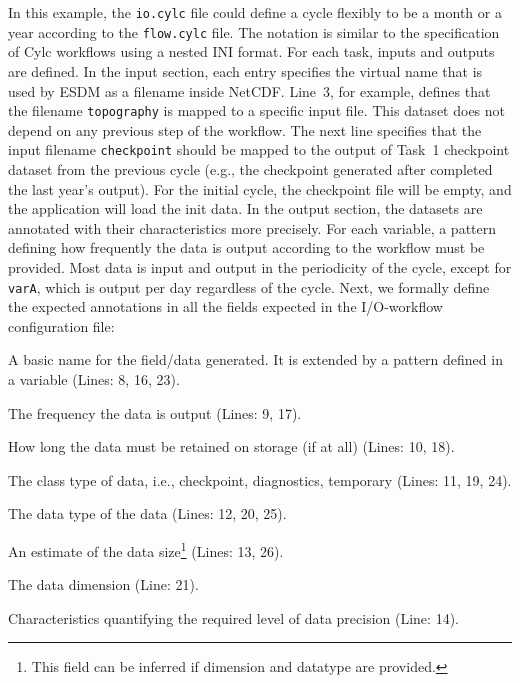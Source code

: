 \documentclass{superfri}
\begin{document}
In this example, the \texttt{io.cylc} file could define a cycle flexibly to be a month or a year according to the \texttt{flow.cylc} file.
The notation is similar to the specification of Cylc workflows using a nested INI format.
For each task, inputs and outputs are defined.
In the input section, each entry specifies the virtual name that is used by ESDM as a filename inside NetCDF.
Line~3, for example, defines that the filename \texttt{topography} is mapped to a specific input file.
This dataset does not depend on any previous step of the workflow.
The next line specifies that the input filename \texttt{checkpoint} should be mapped to the output of Task~1 checkpoint dataset from the previous cycle (e.g., the checkpoint generated after completed the last year's output).
For the initial cycle, the checkpoint file will be empty, and the application will load the init data.
In the output section, the datasets are annotated with their characteristics more precisely.
For each variable, a pattern defining how frequently the data is output according to the workflow must be provided.
Most data is input and output in the periodicity of the cycle, except for \texttt{varA}, which is output per day regardless of the cycle.
Next, we formally define the expected annotations in all the fields expected in the I/O-workflow configuration file:

\begin{description}[itemsep=0pt]
  \item[Name] A basic name for the field/data generated. It is extended by a pattern defined in a variable (Lines: 8, 16, 23).

  \item[Pattern] The frequency the data is output (Lines: 9, 17).

  \item[Lifetime] How long the data must be retained on storage (if at all) (Lines: 10, 18).

  \item[Type] The class type of data, i.e., checkpoint, diagnostics, temporary (Lines: 11, 19, 24).

  \item[Datatype] The data type of the data (Lines: 12, 20, 25).

  \item[Size] An estimate of the data size\footnote{This field can be inferred if dimension and datatype are provided.} (Lines: 13, 26).

  \item[Dimension] The data dimension (Line: 21).

  \item[Accuracy] Characteristics quantifying the required level of data precision (Line: 14).

\end{description}
\end{document}

